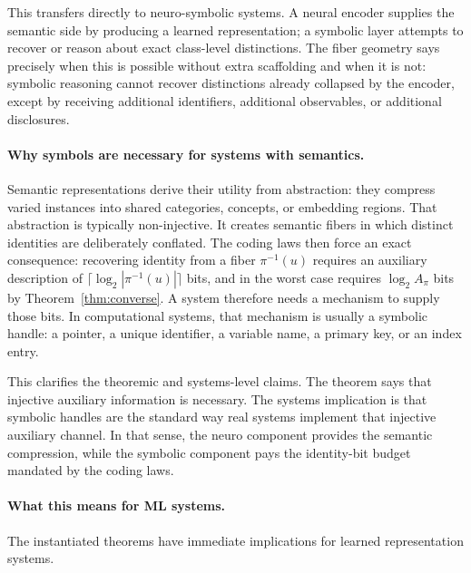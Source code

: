 This transfers directly to neuro-symbolic systems. A neural encoder supplies the semantic side by producing a learned representation; a symbolic layer attempts to recover or reason about exact class-level distinctions. The fiber geometry says precisely when this is possible without extra scaffolding and when it is not: symbolic reasoning cannot recover distinctions already collapsed by the encoder, except by receiving additional identifiers, additional observables, or additional disclosures.

\paragraph{Why symbols are necessary for systems with semantics.}
Semantic representations derive their utility from abstraction: they compress varied instances into shared categories, concepts, or embedding regions. That abstraction is typically non-injective. It creates semantic fibers in which distinct identities are deliberately conflated. The coding laws then force an exact consequence: recovering identity from a fiber $\pi^{-1}(u)$ requires an auxiliary description of $\lceil \log_2 |\pi^{-1}(u)| \rceil$ bits, and in the worst case requires $\log_2 A_\pi$ bits by Theorem~\ref{thm:converse}. A system therefore needs a mechanism to supply those bits. In computational systems, that mechanism is usually a symbolic handle: a pointer, a unique identifier, a variable name, a primary key, or an index entry.

This clarifies the theoremic and systems-level claims. The theorem says that injective auxiliary information is necessary. The systems implication is that symbolic handles are the standard way real systems implement that injective auxiliary channel. In that sense, the neuro component provides the semantic compression, while the symbolic component pays the identity-bit budget mandated by the coding laws.

\paragraph{What this means for ML systems.}
The instantiated theorems have immediate implications for learned representation systems.

